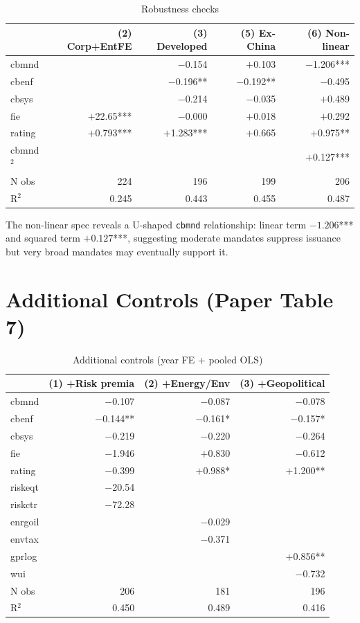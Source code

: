 \documentclass[12pt,a4paper]{article}
\begin{document}
\begin{table}[H]
\centering
\caption{Robustness checks}
\label{tab:robust}
\begin{tabular}{lrrrr}
\toprule
 & (2) Corp+EntFE & (3) Developed & (5) Ex-China & (6) Non-linear \\
\midrule
cbmnd  &          & $-$0.154   & $+$0.103  & $-$1.206*** \\
cbenf  &          & $-$0.196** & $-$0.192** & $-$0.495 \\
cbsys  &          & $-$0.214   & $-$0.035  & $+$0.489 \\
fie    & $+$22.65*** & $-$0.000 & $+$0.018 & $+$0.292 \\
rating & $+$0.793*** & $+$1.283*** & $+$0.665 & $+$0.975** \\
cbmnd$^2$ &      &          &          & $+$0.127*** \\
\midrule
N obs  & 224 & 196 & 199 & 206 \\
R$^2$  & 0.245 & 0.443 & 0.455 & 0.487 \\
\bottomrule
\end{tabular}
\end{table}

\noindent The non-linear spec reveals a U-shaped \texttt{cbmnd} relationship:
linear term $-1.206$*** and squared term $+0.127$***, suggesting moderate
mandates suppress issuance but very broad mandates may eventually support it.

\section{Additional Controls (Paper Table 7)}

\begin{table}[H]
\centering
\caption{Additional controls (year FE + pooled OLS)}
\label{tab:addctrl}
\begin{tabular}{lrrr}
\toprule
 & (1) +Risk premia & (2) +Energy/Env & (3) +Geopolitical \\
\midrule
cbmnd   & $-$0.107   & $-$0.087   & $-$0.078   \\
cbenf   & $-$0.144** & $-$0.161*  & $-$0.157*  \\
cbsys   & $-$0.219   & $-$0.220   & $-$0.264   \\
fie     & $-$1.946   & $+$0.830   & $-$0.612   \\
rating  & $-$0.399   & $+$0.988*  & $+$1.200** \\
riskeqt & $-$20.54   &            &            \\
riskctr & $-$72.28   &            &            \\
enrgoil &            & $-$0.029   &            \\
envtax  &            & $-$0.371   &            \\
gprlog  &            &            & $+$0.856** \\
wui     &            &            & $-$0.732   \\
\midrule
N obs   & 206 & 181 & 196 \\
R$^2$   & 0.450 & 0.489 & 0.416 \\
\bottomrule
\end{tabular}
\end{table}
\end{document}
